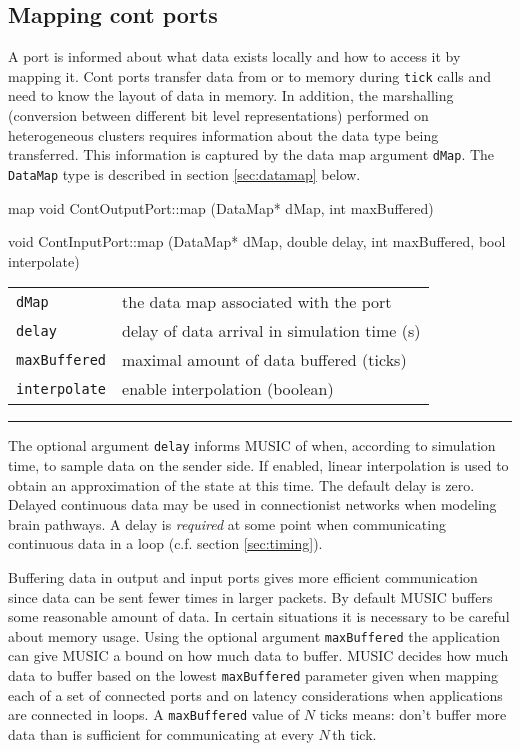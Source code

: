 \documentclass[a4paper,twoside]{report}
\makeatletter
\newenvironment{parameters}%
{\begin{tabular}{@{\hspace{2em}}lp{0.6\textwidth}}}%
{\end{tabular}\par\vspace{1mm}\par\hrule\par\vspace{5mm}}
\makeatother
\begin{document}
\subsection{Mapping cont ports}

A port is informed about what data exists locally and how to access it
by mapping it.  Cont ports transfer data from or to memory during
\lstinline|tick| calls and need to know the layout of data in memory.
In addition, the marshalling (conversion between different bit level
representations) performed on heterogeneous clusters requires
information about the data type being transferred.  This information
is captured by the data map argument \lstinline|dMap|.  The
\lstinline|DataMap| type is described in section \ref{sec:datamap}
below.

\begin{head}{map}
  void ContOutputPort::map (DataMap* dMap,
                            int maxBuffered)

  void ContInputPort::map (DataMap* dMap,
                           double delay,
                           int maxBuffered,
                           bool interpolate)
\end{head}
\begin{parameters}
  \lstinline|dMap| & the data map associated with the port \\
  \lstinline|delay| & delay of data arrival in simulation time (s) \\
  \lstinline|maxBuffered| & maximal amount of data buffered (ticks)
  \\
  \lstinline|interpolate| & enable interpolation (boolean) \\
\end{parameters}

The optional argument \lstinline|delay| informs MUSIC of when,
according to simulation time, to sample data on the sender side.  If
enabled, linear interpolation is used to obtain an approximation of
the state at this time.  The default delay is zero.  Delayed continuous
data may be used in connectionist networks when modeling brain
pathways.  A delay is \emph{required} at some point when communicating
continuous data in a loop (c.f. section \ref{sec:timing}).

Buffering data in output and input ports gives more efficient
communication since data can be sent fewer times in larger packets.
By default MUSIC buffers some reasonable amount of data.  In certain
situations it is necessary to be careful about memory usage.  Using
the optional argument \lstinline|maxBuffered| the application can
give MUSIC a bound on how much data to buffer.  MUSIC decides how much
data to buffer based on the lowest \lstinline|maxBuffered| parameter
given when mapping each of a set of connected ports and on latency
considerations when applications are connected in loops.  A
\lstinline|maxBuffered| value of \(N\) ticks means: don't buffer more
data than is sufficient for communicating at every \(N\)\,th tick.
\end{document}
